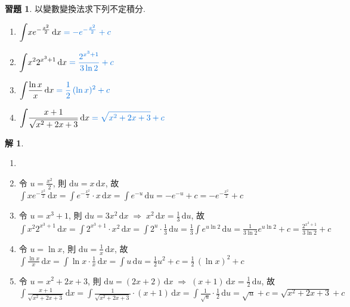 \documentclass[12pt,a4paper]{extarticle}
\newcommand{\ds}{\displaystyle}
\newcommand{\ie}{\;\Longrightarrow\;}
\theoremstyle{definition}
\newtheorem*{sol}{解}
\newtheorem*{exe}{習題}
\begin{document}
\begin{exe} 以變數變換法求下列不定積分. 
  \setlength{\columnsep}{-1cm}
  \begin{multicols}{2}
    \begin{enumerate}\setlength{\itemsep}{0pt}
      \item $\ds\int\!x e^{-\frac{x^2}{2}}\,\mathrm{d}x {\color{C2}\;= -e^{-\frac{x^2}{2}} + c}$
      \item $\ds\int\!x^2 2^{x^3 + 1}\,\mathrm{d}x {\color{C2}\;= \frac{2^{x^3 + 1}}{3\ln 2} + c}$
      \item $\ds\int\!\frac{\ln x}{x}\,\mathrm{d}x {\color{C2}\;= \frac{1}{2}\,(\ln x)^2 + c}$
      \item $\ds\int\!\frac{x + 1}{\sqrt{x^2 + 2x + 3}}\,\mathrm{d}x {\color{C2}\;= \sqrt{x^2 + 2x + 3} + c}$
    \end{enumerate} 
  \end{multicols}
\end{exe}

\begin{sol}
  \begin{enumerate}\setlength{\itemsep}{0pt}
    \item[]
    \item 令 $\ds u = \frac{x^2}{2}$, 則 $\ds\text{d}u = x\,\text{d}x$, 故 $\ds\int x e^{-\frac{x^2}{2}}\,\mathrm{d}x = \int e^{-\frac{x^2}{2}}\cdot x\,\mathrm{d}x = \int e^{-u}\,\text{d}u = -e^{-u} + c = -e^{-\frac{x^2}{2}} + c$
    \item 令 $\ds u = x^3 + 1$, 則 $\ds\text{d} u = 3 x^2\,\text{d}x\ie x^2\,\text{d}x = \frac{1}{3}\,\text{d}u$, 故 $\ds\int x^2 2^{x^3 + 1}\,\mathrm{d}x = \int 2^{x^3 + 1}\cdot x^2\,\text{d}x = \int 2^u\cdot\frac{1}{3}\,\text{d}u = \frac{1}{3}\int e^{u\ln 2}\,\text{d}u = \frac{1}{3\ln 2}e^{u\ln 2} + c = \frac{2^{x^3 + 1}}{3\ln 2} + c$
    \item 令 $\ds u = \ln x$, 則 $\ds\text{d} u = \frac{1}{x}\,\text{d}x$, 故 $\ds\int\!\frac{\ln x}{x}\,\mathrm{d}x = \int\!\ln x\cdot\frac{1}{x}\,\text{d}x = \int u\,\text{d}u = \frac{1}{2} u^2 + c = \frac{1}{2}\,(\ln x)^2 + c$
    \item 令 $\ds u = x^2 + 2x + 3$, 則 $\ds\text{d} u = (2 x + 2)\,\text{d}x\ie (x + 1)\,\text{d}x = \frac{1}{2}\,\text{d}u$, 故 $\ds\int\!\frac{x + 1}{\sqrt{x^2 + 2x + 3}}\,\mathrm{d}x = \int\!\frac{1}{\sqrt{x^2 + 2x + 3}}\cdot(x + 1)\,\text{d}x = \int\!\frac{1}{\sqrt{u}}\cdot\frac{1}{2}\,\text{d}u = \sqrt{u} + c = \sqrt{x^2 + 2x + 3} + c$
  \end{enumerate}
\end{sol}
\end{document}

